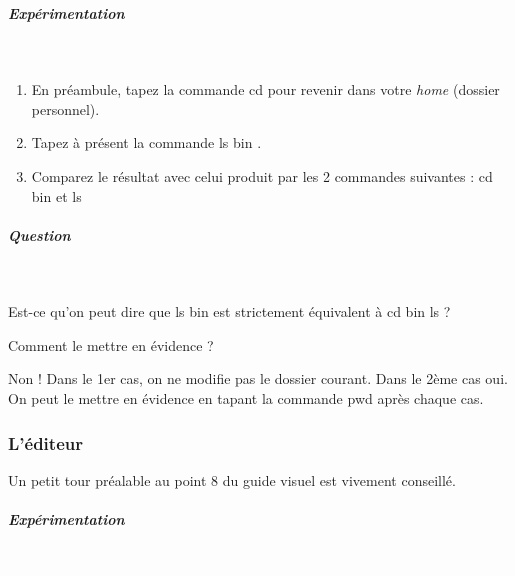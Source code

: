 \documentclass[11pt,a4paper]{article}
\begin{document}
			
		\subparagraph{Exp\'erimentation} 
		
					\textcolor{white}{.} \par
				
            \par
        
					\begin{enumerate}
				
			\item 
	En pr\'eambule, tapez la commande cd  pour revenir dans votre  \textit{home}  (dossier personnel).
			\item Tapez \`a pr\'esent la commande ls bin .
			\item Comparez le r\'esultat avec celui produit par les 2 commandes suivantes : cd bin  et ls 
					\end{enumerate}
				
			
		\subparagraph{Question} 
		
					\textcolor{white}{.} \par
				
            \par
        
Est-ce qu'on peut dire que
ls bin 
est strictement \'equivalent \`a
cd bin ls 
?

Comment le mettre en \'evidence ?

			\begin{boxedminipage}[h]{\linewidth}
		
Non ! Dans le 1er cas, on ne modifie pas le dossier courant. Dans le 2\`eme cas oui. On peut le mettre en \'evidence en tapant la commande pwd  apr\`es chaque cas.

			\end{boxedminipage}

			
		\subsubsection{L'\'editeur} 
		\label{TD1TD1learningObject7.tex}
			

Un petit tour pr\'ealable au point 8 du guide visuel est vivement conseill\'e.

  
			
		\subparagraph{Exp\'erimentation} 
		
					\textcolor{white}{.} \par
				
            \par
        
\end{document}
